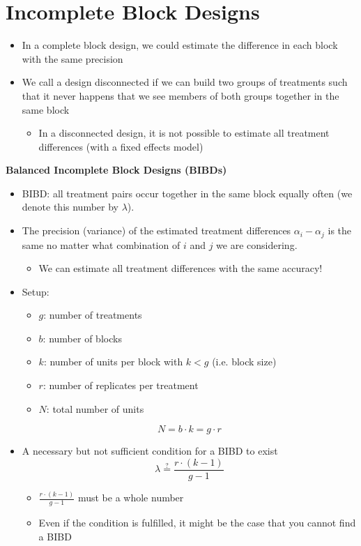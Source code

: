 \documentclass[a4paper]{article}
\begin{document}
\section{Incomplete Block Designs}
\begin{itemize}
    \item In a complete block design, we could estimate the difference in each block with the same precision
    \item We call a design disconnected if we can build two groups of treatments such that it never happens that we see members of both groups together in the same block
    \begin{itemize}
        \item In a disconnected design, it is not possible to estimate all treatment differences (with a fixed effects model)
    \end{itemize}
\end{itemize}
\textbf{Balanced Incomplete Block Designs (BIBDs)}
\begin{itemize}
    \item BIBD: all treatment pairs occur together in the same block equally often (we denote this number by $\lambda$).
    \item The precision (variance) of the estimated treatment differences $\alpha_i-\alpha_j$ is the same no matter what combination of $i$ and $j$ we are considering.
    \begin{itemize}
        \item We can estimate all treatment differences with the same accuracy!
    \end{itemize}
    \item Setup:
    \begin{itemize}
        \item $g$: number of treatments
        \item $b$: number of blocks
        \item $k$: number of units per block with $k<g$ (i.e. block size)
        \item $r$: number of replicates per treatment
        \item $N$: total number of units
    \end{itemize}
    \[N=b\cdot k=g\cdot r \]
    \item A necessary but not sufficient condition for a BIBD to exist
    \[\lambda\overset{?}{=} \frac{r\cdot(k-1)}{g-1} \]
    \begin{itemize}
        \item $\frac{r\cdot(k-1)}{g-1}$ must be a whole number
        \item Even if the condition is fulfilled, it might be the case that you cannot find a BIBD
    \end{itemize}
\end{itemize}
\end{document}
